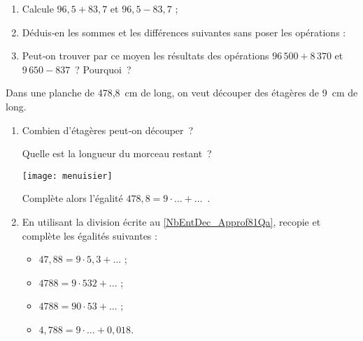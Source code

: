 \begin{exercice}

\begin{enumerate}
 \item Calcule $96,5 + 83,7$ et $96,5 - 83,7$ ;
 \item Déduis‑en les sommes et les différences suivantes sans poser les opérations :
 \item Peut‑on trouver par ce moyen les résultats des opérations $96\,500 + 8\,370$ et $9\,650 - 837$ ? Pourquoi ?
 \end{enumerate}
\end{exercice}


\begin{exercice}

Dans une planche de 478,8 cm de long, on veut découper des étagères de 9 cm de long.
\begin{enumerate}
 \item Combien d'étagères peut‑on découper ? 

Quelle est la longueur du morceau restant ? 

\begin{center} \texttt{[image: menuisier]} \end{center}

Complète alors l'égalité $478,8 = 9 \cdot \ldots + \ldots$ . \label{NbEntDec_Approf81Qa}

 \item En utilisant la division écrite au \ref{NbEntDec_Approf81Qa}, recopie et complète les égalités suivantes :
 \begin{itemize}  
  \item $47,88 = 9 \cdot 5,3 + \ldots$ ;
  \item $4 788 = 9 \cdot 532 + \ldots$ ;
  \item $4 788 = 90 \cdot 53 + \ldots$ ;
  \item $4,788 = 9 \cdot \ldots + 0,018$.
  \end{itemize}
 \end{enumerate}
\end{exercice}



